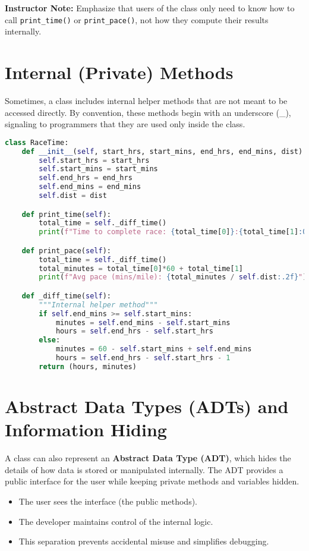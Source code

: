 \vspace{1em}
\noindent
\textbf{Instructor Note:} Emphasize that users of the class only need to know how to call \texttt{print\_time()} or \texttt{print\_pace()}, not how they compute their results internally.

\section{Internal (Private) Methods}
Sometimes, a class includes internal helper methods that are not meant to be accessed directly.  
By convention, these methods begin with an underscore (\_), signaling to programmers that they are used only inside the class.

\begin{lstlisting}[language=Python, caption={RaceTime class with internal helper method.}]
class RaceTime:
    def __init__(self, start_hrs, start_mins, end_hrs, end_mins, dist):
        self.start_hrs = start_hrs
        self.start_mins = start_mins
        self.end_hrs = end_hrs
        self.end_mins = end_mins
        self.dist = dist

    def print_time(self):
        total_time = self._diff_time()
        print(f"Time to complete race: {total_time[0]}:{total_time[1]:02}")

    def print_pace(self):
        total_time = self._diff_time()
        total_minutes = total_time[0]*60 + total_time[1]
        print(f"Avg pace (mins/mile): {total_minutes / self.dist:.2f}")

    def _diff_time(self):
        """Internal helper method"""
        if self.end_mins >= self.start_mins:
            minutes = self.end_mins - self.start_mins
            hours = self.end_hrs - self.start_hrs
        else:
            minutes = 60 - self.start_mins + self.end_mins
            hours = self.end_hrs - self.start_hrs - 1
        return (hours, minutes)
\end{lstlisting}

\section{Abstract Data Types (ADTs) and Information Hiding}
A class can also represent an \textbf{Abstract Data Type (ADT)}, which hides the details of how data is stored or manipulated internally.  
The ADT provides a public interface for the user while keeping private methods and variables hidden.

\begin{itemize}
    \item The user sees the interface (the public methods).
    \item The developer maintains control of the internal logic.
    \item This separation prevents accidental misuse and simplifies debugging.
\end{itemize}


